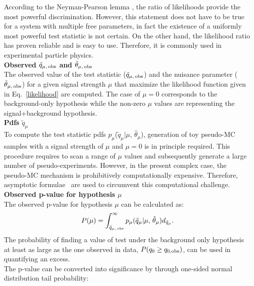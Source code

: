 According to the Neyman-Pearson lemma \cite{Lemma}, the ratio of likelihoods provide the most powerful discrimination. However, this statement does not have to be true for a system with multiple free parameters, in fact the existence of a uniformly most powerful test statistic is not certain. On the other hand, the likelihood ratio has proven reliable and is easy to use. Therefore, it is commonly used in experimental particle physics.
\\
\textbf{Observed $\tilde{q}_{\mu,\,\rm obs}$ and $\hat{\theta}_{\mu,\,\rm obs}$}\\
The observed value of the test statistic ($\tilde{q}_{\mu,\,\rm obs}$) and the nuisance parameter ($\hat{\theta}_{\mu,\,\rm obs}$)  for a given signal strength $\mu$ that maximize the likelihood function given in Eq.~\ref{likelihood} are computed.
The case of $\mu=0$ corresponds to the background-only hypothesis while the non-zero $\mu$ values are representing the signal+background hypothesis.\\
\textbf{Pdfs $\tilde{q}_{\mu}$}\\
To compute the test statistic pdfs $p_{\mu}$($\tilde{q}_{\mu}|\mu,\,\hat{\theta}_{\mu}$), generation of toy pseudo-MC samples with a signal strength of $\mu$ and $\mu=0$ is in principle required. This procedure requires to scan a range of $\mu$ values and subsequently generate a large number of pseudo-experiments. However, in the present complex case, the pseudo-MC mechanism is prohibitively computationally expensive. Therefore, asymptotic formulae~\cite{asymtForm} are used to circumvent this computational challenge.\\ 
\textbf{Observed p-value for hypothesis $\mu$}\\
The observed p-value for hypothesis $\mu$ can be calculated as:
\begin{equation}
\label{p-value}
  P(\mu) = \int_{\tilde{q}_{\mu,\,\rm obs}}^{\infty} p_{\mu}(\tilde{q}_{\mu} | \mu,\,\hat{\theta}_{\mu}) d_{{\tilde q}_{\mu}}.
\end{equation}
The probability of finding a value of test under the background only hypothesis at least as large as the one observed in data, $P(q_0\geq q_{0,\rm obs})$, can be used in quantifying an excess.\\
The p-value can be converted into significance by through one-sided normal distribution tail probability:
